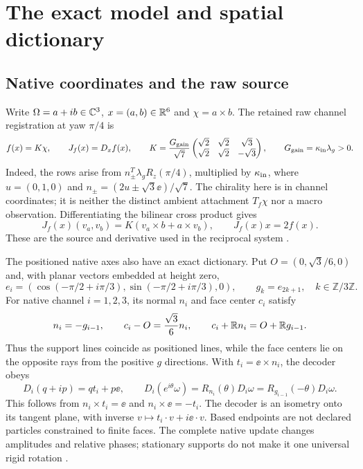 \section{The exact model and spatial dictionary}\label{sec:model}
\subsection{Native coordinates and the raw source}\label{sec:raw}
Write $\Omega=a+ib\in\mathbb C^3$, $x=(a,b)\in\mathbb R^6$ and $\chi=a\times b$. The retained raw channel registration at yaw $\pi/4$ is
\begin{equation}\label{eq:drive}
 f(x)=K\chi,\qquad J_f(x)=D_xf(x),\qquad
 K=\frac{G_{\rm gain}}{\sqrt7}
 \begin{pmatrix}\sqrt2&\sqrt2&\sqrt3\\ \sqrt2&\sqrt2&-\sqrt3\end{pmatrix},
 \qquad G_{\rm gain}=\kappa_{\rm in}\lambda_g>0.
\end{equation}
Indeed, the rows arise from $n_\pm^T\lambda_gR_z(\pi/4)$, multiplied by $\kappa_{\rm in}$, where $u=(0,1,0)$ and $n_\pm=(2u\pm\sqrt3\ee)/\sqrt7$. The chirality here is in channel coordinates; it is neither the distinct ambient attachment $T_f\chi$ nor a macro observation. Differentiating the bilinear cross product gives
\begin{equation}\label{eq:euler}
 J_f(x)(v_a,v_b)=K(v_a\times b+a\times v_b),\qquad J_f(x)x=2f(x).
\end{equation}
These are the source and derivative used in the reciprocal system \cite{RX,RR}.

The positioned native axes also have an exact dictionary. Put $O=(0,\sqrt3/6,0)$ and, with planar vectors embedded at height zero,
\begin{equation}\label{eq:directions}
 e_i=(\cos(-\pi/2+i\pi/3),\sin(-\pi/2+i\pi/3),0),\qquad
 g_k=e_{2k+1},\quad k\in\mathbb Z/3\mathbb Z.
\end{equation}
For native channel $i=1,2,3$, its normal $n_i$ and face center $c_i$ satisfy
\begin{equation}\label{eq:axes}
 n_i=-g_{i-1},\qquad c_i-O=\frac{\sqrt3}{6}n_i,\qquad
 c_i+\mathbb R n_i=O+\mathbb R g_{i-1}.
\end{equation}
Thus the support lines coincide as positioned lines, while the face centers lie on the opposite rays from the positive $g$ directions. With $t_i=\ee\times n_i$, the decoder obeys
\begin{equation}\label{eq:decoder}
 D_i(q+ip)=qt_i+p\ee,\qquad
 D_i(e^{i\theta}\omega)=R_{n_i}(\theta)D_i\omega
 =R_{g_{i-1}}(-\theta)D_i\omega.
\end{equation}
This follows from $n_i\times t_i=\ee$ and $n_i\times\ee=-t_i$. The decoder is an isometry onto its tangent plane, with inverse $v\mapsto t_i\cdot v+i\ee\cdot v$. Based endpoints are not declared particles constrained to finite faces. The complete native update changes amplitudes and relative phases; stationary supports do not make it one universal rigid rotation \cite{AX}.

